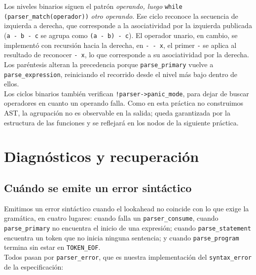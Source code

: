 \documentclass[12pt,letterpaper]{article}
\begin{document}
Los niveles binarios siguen el patrón \emph{operando, luego} \texttt{while (parser\_match(operador))}
\emph{otro operando}. Ese ciclo reconoce la secuencia de izquierda a derecha, que corresponde a la
asociatividad por la izquierda publicada (\texttt{a - b - c} se agrupa como \texttt{(a - b) - c}). El
operador unario, en cambio, se implementó con recursión hacia la derecha, en \texttt{- - x}, el primer
\texttt{-} se aplica al resultado de reconocer \texttt{- x}, lo que corresponde a su asociatividad por la
derecha. Los paréntesis alteran la precedencia porque \texttt{parse\_primary} vuelve a
\texttt{parse\_expression}, reiniciando el recorrido desde el nivel más bajo dentro de ellos.\\

Los ciclos binarios también verifican \texttt{!parser->panic\_mode}, para dejar de buscar operadores en
cuanto un operando falla. Como en esta práctica no construimos AST, la agrupación no es observable en la
salida; queda garantizada por la estructura de las funciones y se reflejará en los nodos de la siguiente
práctica.


\bigskip


\section*{Diagnósticos y recuperación}

\subsection*{Cuándo se emite un error sintáctico}

Emitimos un error sintáctico cuando el lookahead no coincide con lo que exige la gramática, en cuatro
lugares: cuando falla un \texttt{parser\_consume}, cuando \texttt{parse\_primary} no encuentra el inicio de
una expresión; cuando \texttt{parse\_statement} encuentra un token que no inicia ninguna sentencia; y cuando
\texttt{parse\_program} termina sin estar en \texttt{TOKEN\_EOF}.\\

Todos pasan por \texttt{parser\_error}, que es nuestra implementación del \texttt{syntax\_error}
de la especificación:
  
\end{document}
